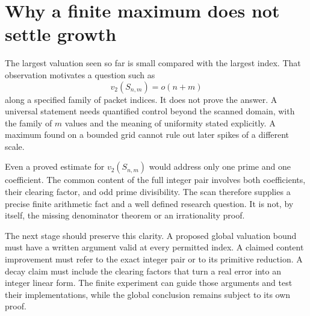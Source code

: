 \section{Why a finite maximum does not settle growth}

The largest valuation seen so far is small compared with the largest
index. That observation motivates a question such as
\[
 v_2(S_{n,m})=o(n+m)
\]
along a specified family of packet indices. It does not prove the answer.
A universal statement needs quantified control beyond the scanned domain,
with the family of $m$ values and the meaning of uniformity stated
explicitly. A maximum found on a bounded grid cannot rule out later spikes
of a different scale.

Even a proved estimate for $v_2(S_{n,m})$ would address only one prime and
one coefficient. The common content of the full integer pair involves both
coefficients, their clearing factor, and odd prime divisibility. The scan
therefore supplies a precise finite arithmetic fact and a well defined
research question. It is not, by itself, the missing denominator theorem
or an irrationality proof.

The next stage should preserve this clarity. A proposed global valuation
bound must have a written argument valid at every permitted index. A
claimed content improvement must refer to the exact integer pair or to
its primitive reduction. A decay claim must include the clearing factors
that turn a real error into an integer linear form. The finite experiment
can guide those arguments and test their implementations, while the
global conclusion remains subject to its own proof.

